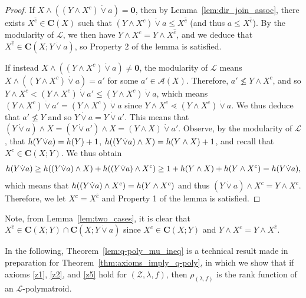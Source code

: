 \documentclass[a4paper,11pt,reqno]{article}
\theoremstyle{definition}
\newcommand{\mL}{\mathcal{L}}
\newcommand{\mZ}{\mathcal{Z}}
\newcommand{\zero}{{\mathbf{0}}}
\begin{document}
\begin{proof}
    If $X\wedge((Y\wedge X^c)\dot\vee a)=\zero$, then by Lemma~\ref{lem:dir_join_assoc}, there exists $X^{\hat{c}}\in\mathbf{C}(X)$ such that $(Y\wedge X^c)\dot\vee a\leq X^{\hat{c}}$ (and thus $a\leq X^{\hat{c}}$). By the modularity of $\mathcal{L}$, we then have $Y\wedge X^c=Y\wedge X^{\hat{c}}$, and we deduce that $X^{\hat{c}}\in\mathbf{C}(X;Y\dot\vee a)$, so Property 2 of the lemma is satisfied.

    If instead $X\wedge((Y\wedge X^c)\dot\vee a)\neq\zero$, the modularity of $\mathcal{L}$ means $X\wedge((Y\wedge X^c)\dot\vee a)=a'$ for some $a'\in\mathcal{A}(X)$. Therefore, $a'\nleq Y\wedge X^c$, and so $Y\wedge X^c<(Y\wedge X^c)\dot\vee a'\leq(Y\wedge X^c)\dot\vee a$, which means $(Y\wedge X^c)\dot\vee a'=(Y\wedge X^c)\dot\vee a$ since $Y\wedge X^c\lessdot(Y\wedge X^c)\dot\vee a$. We thus deduce that $a'\nleq Y$ and so $Y\dot\vee a=Y\dot\vee a'$. This means that $(Y\dot\vee a)\wedge X=(Y\dot\vee a')\wedge X=(Y\wedge X)\dot\vee a'$. Observe, by the modularity of $\mathcal{L}$, that $\textup{h}(Y\dot\vee a)=\textup{h}(Y)+1$, $\textup{h}((Y\dot\vee a)\wedge X)=\textup{h}(Y\wedge X)+1$, and recall that $X^c\in\mathbf{C}(X;Y)$. We thus obtain
    $$\textup{h}(Y\dot\vee a)\geq\textup{h}((Y\dot\vee a)\wedge X)+\textup{h}((Y\dot\vee a)\wedge X^c)\geq 1+\textup{h}(Y\wedge X)+\textup{h}(Y\wedge X^c)=\textup{h}(Y\dot\vee a),$$
    which means that $\textup{h}((Y\dot\vee a)\wedge X^c)=\textup{h}(Y\wedge X^c)$ and thus $(Y\dot\vee a)\wedge X^c=Y\wedge X^c$. Therefore, we let $X^c=X^{\hat{c}}$ and Property 1 of the lemma is satisfied.
\end{proof}



Note, from Lemma~\ref{lem:two_cases}, it is clear that $X^{\hat{c}}\in\mathbf{C}(X;Y)\cap\mathbf{C}(X;Y\dot\vee a)$ since $X^c\in\mathbf{C}(X;Y)$ and $Y\wedge X^c=Y\wedge X^{\hat{c}}$.

In the following, Theorem~\ref{lem:q-poly_mu_ineq} is a technical result made in preparation for Theorem~\ref{thm:axioms_imply_q-poly}, in which we show that if axioms \ref{z1}, \ref{z2}, and \ref{z5} hold for $(\mZ, \lambda, f)$, then $\rho_{(\lambda,f)}$ is the rank function of an $\mL$-polymatroid.
\end{document}
